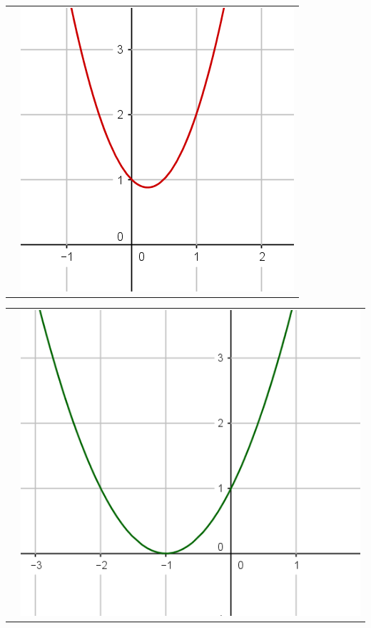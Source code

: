 \documentclass[12pt,a4paper]{article}
\date{}
\title{}
\begin{document}


\newpage

\begin{tabular}{cc }
	 &
	
	\includegraphics[scale=0.3]{./img/fig_5}\\
\end{tabular}



\begin{tabular}{cc }
	 &
	
	\includegraphics[scale=0.25]{./img/fig_1}\\
\end{tabular}	
\end{document}
